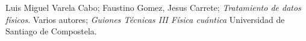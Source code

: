 \documentclass[12pt,a4paper]{article}
\numberwithin{equation}{section}
\numberwithin{table}{section}
\numberwithin{figure}{section}
\begin{document}
\newpage 


\begin{thebibliography}{n}
 Luis Miguel Varela Cabo; Faustino Gomez, Jesus Carrete;
{\it Tratamiento de datos físicos}.
 Varios autores; {\it Guiones Técnicas III Física cuántica}
Universidad de Santiago de Compostela.

\end{thebibliography}
\end{document}
